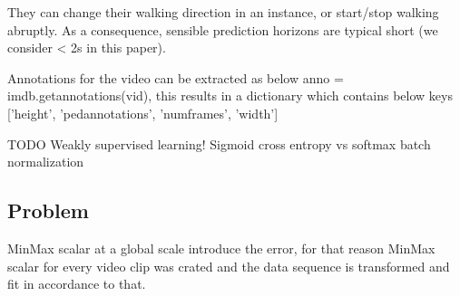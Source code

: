 They can change their walking direction in an instance,
or start/stop walking abruptly. As a consequence, sensible prediction horizons
are typical short (we consider < 2s in this paper).



Annotations for the video can be extracted as below
anno = imdb.\textunderscore get\textunderscore annotations(vid), this results in a dictionary which contains below keys ['height', 'ped\textunderscore annotations', 'num\textunderscore frames', 'width']

TODO
\newpara Weakly supervised learning!
Sigmoid cross entropy vs  softmax
batch normalization


\subsection{Problem}
MinMax scalar at a global scale introduce the error, for that reason MinMax scalar for every video clip was crated and the data sequence is transformed and fit in accordance to that.
 
